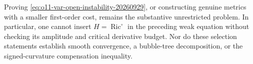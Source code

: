 Proving \eqref{eq:o11-var-open-instability-20260929}, or constructing
genuine metrics with a smaller first-order cost, remains the substantive
unrestricted problem. In particular, one cannot insert
$H=\operatorname{Ric}^{\circ}$ in the preceding weak equation without
checking its amplitude and critical derivative budget. Nor do these
selection statements establish smooth convergence, a bubble-tree
decomposition, or the signed-curvature compensation inequality.
